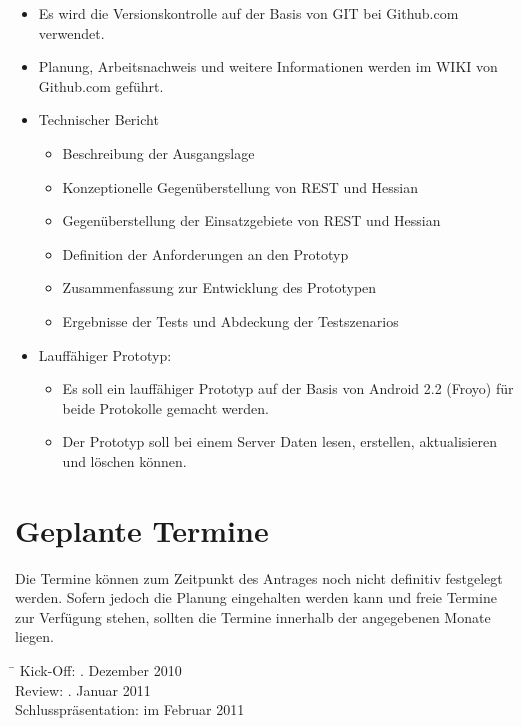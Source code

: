 \documentclass[listof=totoc,bibliography=totoc]{scrreprt}
\begin{document}
    \begin{itemize}    
        \item Es wird die Versionskontrolle auf der Basis von GIT bei
            Github.com verwendet.
        \item Planung, Arbeitsnachweis und weitere Informationen werden im WIKI
            von Github.com geführt.
        \item Technischer Bericht
        \begin{itemize}
            \item Beschreibung der Ausgangslage
            \item Konzeptionelle Gegenüberstellung von REST und Hessian
            \item Gegenüberstellung der Einsatzgebiete von REST und Hessian
            \item Definition der Anforderungen an den Prototyp 
            \item Zusammenfassung zur Entwicklung des Prototypen
            \item Ergebnisse der Tests und Abdeckung der Testszenarios
            
        \end{itemize}
    	\item Lauffähiger Prototyp:
    	\begin{itemize}
            \item Es soll ein lauffähiger Prototyp auf der Basis von
                Android 2.2 (Froyo) für beide Protokolle gemacht werden.
             \item Der Prototyp soll bei einem Server Daten lesen, erstellen,
                aktualisieren und löschen können.
        \end{itemize}
    \end{itemize}

    \section{Geplante Termine}
    Die Termine können zum Zeitpunkt des Antrages noch nicht definitiv 
    festgelegt werden. Sofern jedoch die Planung eingehalten werden kann und 
    freie Termine zur Verfügung stehen, sollten die Termine innerhalb der 
    angegebenen Monate liegen.

    \begin{tabbing}
        \hspace*{4cm}\= \kill
    	Kick-Off:               . Dezember 2010 \\
    	Review:                 . Januar 2011 \\
    	Schlusspräsentation:    \> im Februar 2011 \\
    \end{tabbing}
\end{document}
